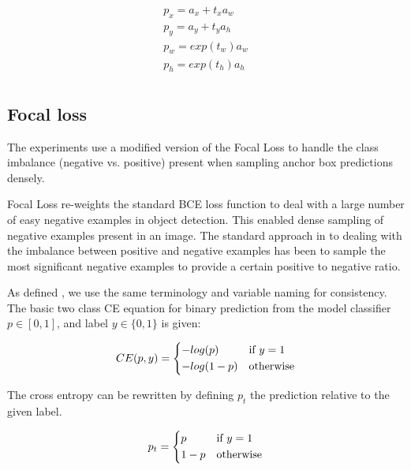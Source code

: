 \begin{equation}
\begin{split}
p_x = a_x + t_x  a_w\\
p_y = a_y + t_y  a_h\\
p_w = exp(t_w) a_w \\
p_h = exp(t_h) a_h\\
\end{split}
\label{eq:decoding_rcnn}
\end{equation}

\subsection {Focal loss}
\label{sec:loss}


The experiments use a modified version of the Focal Loss \cite{Lin2017} to handle the class imbalance (negative vs. positive) present when sampling anchor box predictions densely.

Focal Loss \cite{Lin2017} re-weights the standard \gls{BCE} loss function to deal with a large number of easy negative examples in object detection. This enabled dense sampling of negative examples present in an image. The standard approach in to dealing with the imbalance between positive and negative examples has been to sample the most significant negative examples to provide a certain positive to negative ratio.


As defined \cite{Lin2017}, we use the same terminology and variable naming for consistency. The basic two class \gls{CE} equation for binary prediction from the model classifier $p \in \left[0, 1\right]$, and label $y \in \{0, 1\}$  is given:

\begin{equation}
CE(p, y) = 
  \begin{cases*}
  -log(p) & if $y = 1$\\
  -log(1-p) & otherwise\\
  \end{cases*}
\label{eq:cross_entropy}
\end{equation}


The cross entropy can be rewritten by defining $p_t$ the prediction relative to the given label.

\begin{equation}
p_t = 
  \begin{cases*}
  p & if $y = 1$\\
  1 - p & otherwise\\
  \end{cases*}
\label{eq:class_prob}
\end{equation}


